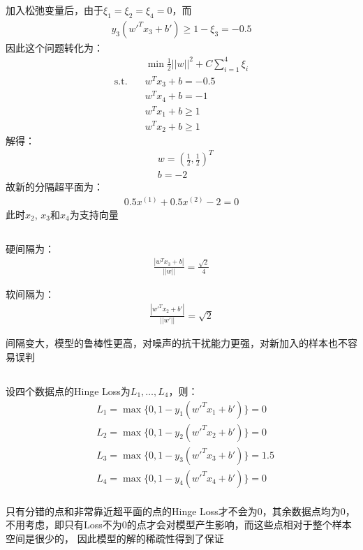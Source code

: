 \documentclass[12pt, a4paper]{article}
\begin{document}
加入松弛变量后，由于$\xi_1=\xi_2=\xi_4=0$，而
\begin{align*}
    y_3({w'}^T x_3+b')\geq 1-\xi_3=-0.5
\end{align*}
因此这个问题转化为：
\begin{align*}
    &\min \frac{1}{2}||w||^2+C\sum_{i=1}^{4}\xi_i\\
    \text{s.t.} \quad &w^Tx_3+b=-0.5\\
    &w^Tx_4+b=-1\\
    &w^Tx_1+b \geq 1\\
    &w^Tx_2+b \geq 1
\end{align*}
解得：
\begin{align*}
    &w=(\frac{1}{2},\frac{1}{2})^T\\
    &b=-2
\end{align*}
故新的分隔超平面为：
\begin{align*}
    0.5x^{(1)}+0.5x^{(2)}-2=0
\end{align*}
此时$x_2$, $x_3$和$x_4$为支持向量

\subsection{}

硬间隔为：
\begin{align*}
    \frac{|w^Tx_3+b|}{||w||}=\frac{\sqrt{2}}{4}
\end{align*}

软间隔为：
\begin{align*}
    \frac{|{w'}^T x_2+b'|}{||w'||}=\sqrt{2}
\end{align*}

间隔变大，模型的鲁棒性更高，对噪声的抗干扰能力更强，对新加入的样本也不容易误判


\subsection{}

设四个数据点的Hinge Loss为$L_1, \dots, L_4$，则：
\begin{align*}
    &L_1=\max\{0,1-y_1({w'}^T x_1+b')\}=0\\
    &L_2=\max\{0,1-y_2({w'}^T x_2+b')\}=0\\
    &L_3=\max\{0,1-y_3({w'}^T x_3+b')\}=1.5\\
    &L_4=\max\{0,1-y_4({w'}^T x_4+b')\}=0\\
\end{align*}

只有分错的点和非常靠近超平面的点的Hinge Loss才不会为0，其余数据点均为0，
不用考虑，即只有Loss不为0的点才会对模型产生影响，而这些点相对于整个样本空间是很少的，
因此模型的解的稀疏性得到了保证
\end{document}
